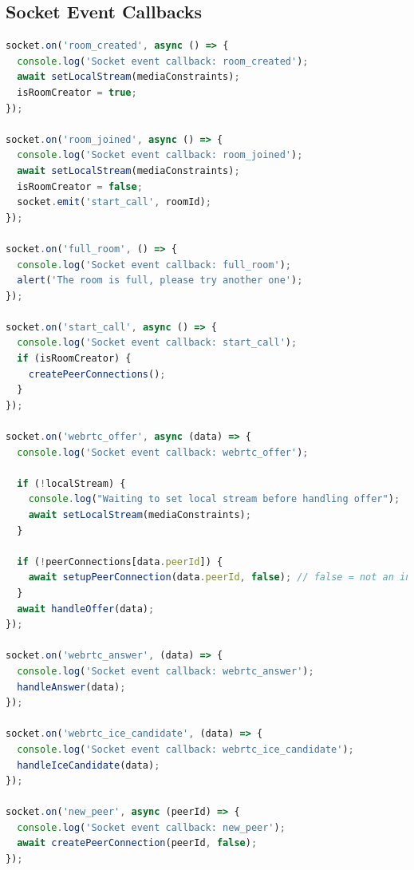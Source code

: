 \documentclass[12pt, a4paper, oneside]{Thesis}
\begin{document}
\newpage

\subsection{Socket Event Callbacks}

\begin{lstlisting}[language=JavaScript, caption={Socket Event Callbacks}, label=Socket Event Callbacks]
  socket.on('room_created', async () => {
  console.log('Socket event callback: room_created');
  await setLocalStream(mediaConstraints);
  isRoomCreator = true;
});

socket.on('room_joined', async () => {
  console.log('Socket event callback: room_joined');
  await setLocalStream(mediaConstraints);
  isRoomCreator = false;
  socket.emit('start_call', roomId);
}); 

socket.on('full_room', () => {
  console.log('Socket event callback: full_room');
  alert('The room is full, please try another one');
});

socket.on('start_call', async () => {
  console.log('Socket event callback: start_call');
  if (isRoomCreator) {
    createPeerConnections();
  }
});

socket.on('webrtc_offer', async (data) => {
  console.log('Socket event callback: webrtc_offer');
  
  if (!localStream) {
    console.log("Waiting to set local stream before handling offer");
    await setLocalStream(mediaConstraints);
  }
  
  if (!peerConnections[data.peerId]) {
    await setupPeerConnection(data.peerId, false); // false = not an initiator
  }
  await handleOffer(data);
});

socket.on('webrtc_answer', (data) => {
  console.log('Socket event callback: webrtc_answer');
  handleAnswer(data);
});

socket.on('webrtc_ice_candidate', (data) => {
  console.log('Socket event callback: webrtc_ice_candidate');
  handleIceCandidate(data);
});

socket.on('new_peer', async (peerId) => {
  console.log('Socket event callback: new_peer');
  await createPeerConnection(peerId, false);
});
\end{lstlisting}
\end{document}
